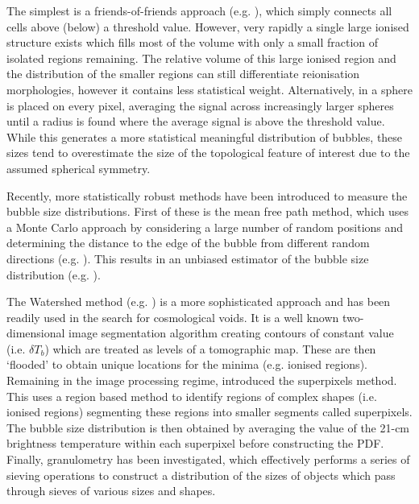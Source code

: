 The simplest is a friends-of-friends approach (e.g. \cite{Iliev:2006,Friedrich:2011}), which simply connects all cells above (below) a threshold value. However, very rapidly a single large ionised structure exists which fills most of the volume with only a small fraction of isolated regions remaining. The relative volume of this large ionised region and the distribution of the smaller regions can still differentiate reionisation morphologies, however it contains less statistical weight. Alternatively, in \cite{Zahn:2007} a sphere is placed on every pixel, averaging the signal across increasingly larger spheres until a radius is found where the average signal is above the threshold value. While this generates a more statistical meaningful distribution of bubbles, these sizes tend to overestimate the size of the topological feature of interest due to the assumed spherical symmetry.

Recently, more statistically robust methods have been introduced to measure the bubble size distributions. First of these is the mean free path method, which uses a Monte Carlo approach by considering a large number of random positions and determining the distance to the edge of the bubble from different random directions (e.g. \cite{Mesinger:2007}). This results in an unbiased estimator of the bubble size distribution (e.g. \cite{Lin:2016}). 

The Watershed method (e.g. \cite{Lin:2016}) is a more sophisticated approach and has been readily used in the search for cosmological voids. It is a well known two-dimensional image segmentation algorithm creating contours of constant value (i.e. $\delta T_{b}$) which are treated as levels of a tomographic map. These are then `flooded' to obtain unique locations for the minima (e.g. ionised regions). Remaining in the image processing regime, \cite{Giri:2018} introduced the superpixels method. This uses a region based method to identify regions of complex shapes (i.e. ionised regions) segmenting these regions into smaller segments called superpixels. The bubble size distribution is then obtained by averaging the value of the 21-cm brightness temperature within each superpixel before constructing the PDF. Finally, granulometry \cite{Kakiichi:2017} has been investigated, which effectively performs a series of sieving operations to construct a distribution of the sizes of objects which pass through sieves of various sizes and shapes. 

